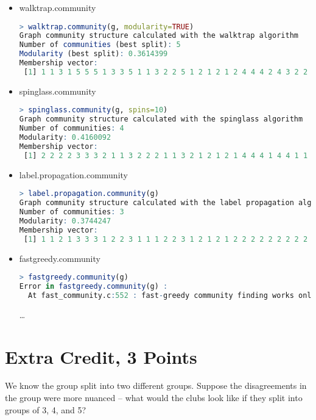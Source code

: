 \documentclass[letterpaper,11pt]{article}
\begin{document}
\begin{itemize}
\item	walktrap.community\\
\begin{lstlisting}[language=R,frame=single]
> walktrap.community(g, modularity=TRUE)
Graph community structure calculated with the walktrap algorithm
Number of communities (best split): 5 
Modularity (best split): 0.3614399 
Membership vector:
 [1] 1 1 3 1 5 5 5 1 3 3 5 1 1 3 2 2 5 1 2 1 2 1 2 4 4 4 2 4 3 2 2 3 2 2
\end{lstlisting}
\item spinglass.community\\
\begin{lstlisting}[language=R,frame=single]
> spinglass.community(g, spins=10)
Graph community structure calculated with the spinglass algorithm
Number of communities: 4 
Modularity: 0.4160092 
Membership vector:
 [1] 2 2 2 2 3 3 3 2 1 1 3 2 2 2 1 1 3 2 1 2 1 2 1 4 4 4 1 4 4 1 1 4 1 1
\end{lstlisting}
\newpage
\item label.propagation.community\\
\begin{lstlisting}[language=R,frame=single]
> label.propagation.community(g)
Graph community structure calculated with the label propagation algorithm
Number of communities: 3 
Modularity: 0.3744247 
Membership vector:
 [1] 1 1 2 1 3 3 3 1 2 2 3 1 1 1 2 2 3 1 2 1 2 1 2 2 2 2 2 2 2 2 2 2 2 2
\end{lstlisting}
\item fastgreedy.community\\
\begin{lstlisting}[language=R,frame=single]
> fastgreedy.community(g)
Error in fastgreedy.community(g) : 
  At fast_community.c:552 : fast-greedy community finding works only on graphs without multiple edges, Invalid value
\end{lstlisting}
\ldots
\end{itemize}
\newpage

\section*{Extra Credit, 3 Points}

We know the group split into two different groups. Suppose the disagreements in the group were more nuanced -- what would the clubs look like if they split into groups of 3, 4, and 5?

\newpage
\end{document}
